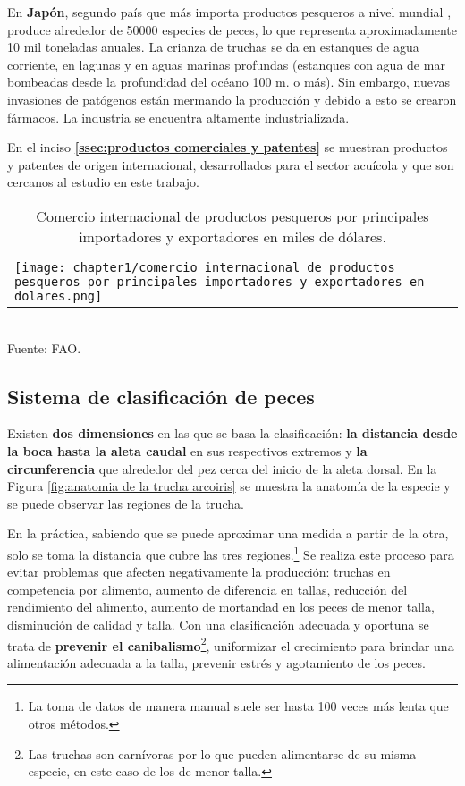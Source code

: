 En \textbf{Japón}, segundo país que más importa productos pesqueros a nivel mundial \cite[p.~44]{FAO2017}, produce alrededor de 50000 especies de peces, lo que representa aproximadamente 10 mil toneladas anuales. La crianza de truchas se da en estanques de agua corriente, en lagunas y en aguas marinas profundas (estanques con agua de mar bombeadas desde la profundidad del océano 100 m. o más). Sin embargo, nuevas invasiones de patógenos están mermando la producción y debido a esto se crearon fármacos. La industria se encuentra altamente industrializada. \cite[p.~1-5]{2005} 

En el inciso \textbf{\ref{ssec:productos comerciales y patentes}} se muestran productos y patentes de origen internacional, desarrollados para el sector acuícola y que son cercanos al estudio en este trabajo.

\begin{table}[H]
	\centering	
	\caption{Comercio internacional de productos pesqueros por principales importadores y exportadores en miles de dólares.}
	\label{tbl:comercio internacional de productos pesqueros por principales importadores y exportadores en dolares}
	\begin{tabular}{ l }
		\begin{minipage}{1\textwidth}
			\texttt{[image: chapter1/comercio internacional de productos pesqueros por principales importadores y exportadores en dolares.png]}
		\end{minipage}	
	\end{tabular}
	\\	Fuente: FAO.
\end{table}

\subsection{Sistema de clasificación de peces}
\label{ssec:sistema de clasificacion de peces}

Existen \textbf{dos dimensiones} en las que se basa la clasificación: \textbf{la distancia desde la boca hasta la aleta caudal} en sus respectivos extremos y \textbf{la circunferencia} que alrededor del pez cerca del inicio de la aleta dorsal. En la Figura \ref{fig:anatomia de la trucha arcoiris} se muestra la anatomía de la especie y se puede observar las regiones de la trucha.

En la práctica, sabiendo que se puede aproximar una medida a partir de la otra, solo se toma la distancia que cubre las tres regiones.\footnote{La toma de datos de manera manual suele ser hasta 100 veces más lenta que otros métodos.} Se realiza este proceso para evitar problemas que afecten negativamente la producción: truchas en competencia por alimento, aumento de diferencia en tallas, reducción del rendimiento del alimento, aumento de mortandad en los peces de menor talla, disminución de calidad y talla. Con una clasificación adecuada y oportuna se trata de \textbf{prevenir el canibalismo}\footnote{Las truchas son carnívoras por lo que pueden alimentarse de su misma especie, en este caso de los de menor talla.}, uniformizar el crecimiento para brindar una alimentación adecuada a la talla, prevenir estrés y agotamiento de los peces.\cite[p.~16]{Flores2010} 

